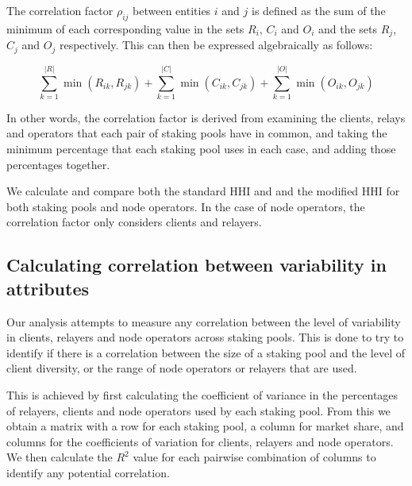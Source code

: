 \documentclass[conference]{IEEEtran}
\begin{document}
The correlation factor $\rho_{ij}$ between entities $i$ and $j$ is defined as the sum of the minimum of each corresponding value in the sets $R_i$, $C_i$ and $O_i$ and the sets $R_j$, $C_j$ and $O_j$ respectively. This can then be expressed algebraically as follows:

\[
\sum_{k=1}^{|R|} \min(R_{ik}, R_{jk}) + \sum_{k=1}^{|C|} \min(C_{ik}, C_{jk}) + \sum_{k=1}^{|O|} \min(O_{ik}, O_{jk})
\]

\vspace{8pt}

In other words, the correlation factor is derived from examining the clients, relays and operators that each pair of staking pools have in common, and taking the minimum percentage that each staking pool uses in each case, and adding those percentages together.

We calculate and compare both the standard HHI and and the modified HHI for both staking pools and node operators.  In the case of node operators, the correlation factor only considers clients and relayers.

\subsection{Calculating correlation between variability in attributes}
\label{sec:correlation-between-variability-in-attributes}

Our analysis attempts to measure any correlation between the level of variability in clients, relayers and node operators across staking pools. This is done to try to identify if there is a correlation between the size of a staking pool and the level of client diversity, or the range of node operators or relayers that are used.

This is achieved by first calculating the coefficient of variance in the percentages of relayers, clients and node operators used by each staking pool. From this we obtain a matrix with a row for each staking pool, a column for market share, and columns for the coefficients of variation for clients, relayers and node operators.  We then calculate the $R^2$ value for each pairwise combination of columns to identify any potential correlation.
\end{document}

